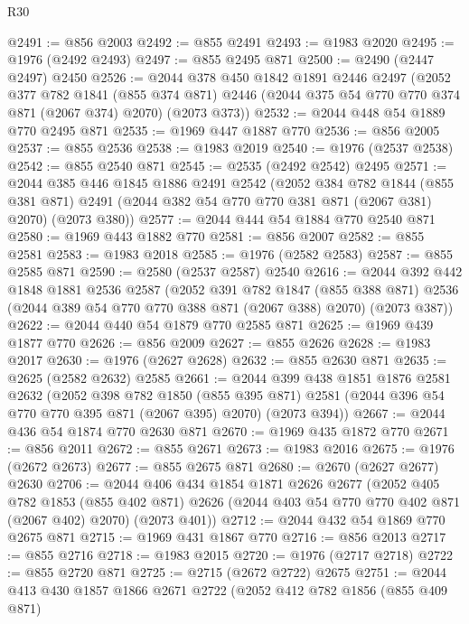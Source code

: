 \begin{lexlean}{R30}
\begin{coremodule}
@2491 := @856 @2003
@2492 := @855 @2491
@2493 := @1983 @2020
@2495 := @1976 (@2492 @2493)
@2497 := @855 @2495 @871
@2500 := @2490 (@2447 @2497) @2450
@2526 := @2044
    @378
    @450
    @1842
    @1891
    @2446
    @2497
    (@2052
      @377
      @782
      @1841
      (@855 @374 @871)
      @2446
      (@2044 @375 @54 @770 @770 @374 @871 (@2067 @374) @2070)
      (@2073 @373))
@2532 := @2044 @448 @54 @1889 @770 @2495 @871
@2535 := @1969 @447 @1887 @770
@2536 := @856 @2005
@2537 := @855 @2536
@2538 := @1983 @2019
@2540 := @1976 (@2537 @2538)
@2542 := @855 @2540 @871
@2545 := @2535 (@2492 @2542) @2495
@2571 := @2044
    @385
    @446
    @1845
    @1886
    @2491
    @2542
    (@2052
      @384
      @782
      @1844
      (@855 @381 @871)
      @2491
      (@2044 @382 @54 @770 @770 @381 @871 (@2067 @381) @2070)
      (@2073 @380))
@2577 := @2044 @444 @54 @1884 @770 @2540 @871
@2580 := @1969 @443 @1882 @770
@2581 := @856 @2007
@2582 := @855 @2581
@2583 := @1983 @2018
@2585 := @1976 (@2582 @2583)
@2587 := @855 @2585 @871
@2590 := @2580 (@2537 @2587) @2540
@2616 := @2044
    @392
    @442
    @1848
    @1881
    @2536
    @2587
    (@2052
      @391
      @782
      @1847
      (@855 @388 @871)
      @2536
      (@2044 @389 @54 @770 @770 @388 @871 (@2067 @388) @2070)
      (@2073 @387))
@2622 := @2044 @440 @54 @1879 @770 @2585 @871
@2625 := @1969 @439 @1877 @770
@2626 := @856 @2009
@2627 := @855 @2626
@2628 := @1983 @2017
@2630 := @1976 (@2627 @2628)
@2632 := @855 @2630 @871
@2635 := @2625 (@2582 @2632) @2585
@2661 := @2044
    @399
    @438
    @1851
    @1876
    @2581
    @2632
    (@2052
      @398
      @782
      @1850
      (@855 @395 @871)
      @2581
      (@2044 @396 @54 @770 @770 @395 @871 (@2067 @395) @2070)
      (@2073 @394))
@2667 := @2044 @436 @54 @1874 @770 @2630 @871
@2670 := @1969 @435 @1872 @770
@2671 := @856 @2011
@2672 := @855 @2671
@2673 := @1983 @2016
@2675 := @1976 (@2672 @2673)
@2677 := @855 @2675 @871
@2680 := @2670 (@2627 @2677) @2630
@2706 := @2044
    @406
    @434
    @1854
    @1871
    @2626
    @2677
    (@2052
      @405
      @782
      @1853
      (@855 @402 @871)
      @2626
      (@2044 @403 @54 @770 @770 @402 @871 (@2067 @402) @2070)
      (@2073 @401))
@2712 := @2044 @432 @54 @1869 @770 @2675 @871
@2715 := @1969 @431 @1867 @770
@2716 := @856 @2013
@2717 := @855 @2716
@2718 := @1983 @2015
@2720 := @1976 (@2717 @2718)
@2722 := @855 @2720 @871
@2725 := @2715 (@2672 @2722) @2675
@2751 := @2044
    @413
    @430
    @1857
    @1866
    @2671
    @2722
    (@2052
      @412
      @782
      @1856
      (@855 @409 @871)

\end{coremodule}
\end{lexlean}

